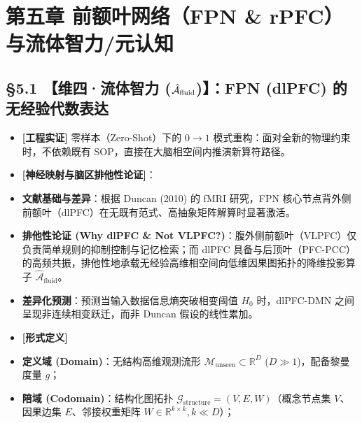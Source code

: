 \documentclass[11pt,a4paper,oneside]{ctexart}
\begin{document}
\section{第五章 前额叶网络（FPN \& rPFC）与流体智力/元认知}

\subsection{§5.1 【维四·流体智力 ($\protect\hat{\mathcal{A}}_{\text{fluid}}$)】：FPN (dlPFC) 的无经验代数表达}

\begin{itemize}\item \textbf{[工程实证]} 零样本（Zero-Shot）下的 $0 \to 1$ 模式重构：面对全新的物理约束时，不依赖既有 SOP，直接在大脑相空间内推演新算符路径。\end{itemize}
\begin{itemize}\item \textbf{[神经映射与脑区排他性论证]}：\end{itemize}
\begin{itemize}\item \textbf{文献基础与差异}：根据 Duncan (2010) 的 fMRI 研究，FPN 核心节点背外侧前额叶（dlPFC）在无既有范式、高抽象矩阵解算时显著激活。\end{itemize}
\begin{itemize}\item \textbf{排他性论证 (Why dlPFC \& Not VLPFC?)}：腹外侧前额叶（VLPFC）仅负责简单规则的抑制控制与记忆检索；而 dlPFC 具备与后顶叶（PFC-PCC）的高频共振，排他性地承载\textit{}无经验高维相空间向低维因果图拓扑的降维投影算子 $\hat{\mathcal{A}}_{\text{fluid}}$\textit{}。\end{itemize}
\begin{itemize}\item \textbf{差异化预测}：预测当输入数据信息熵突破相变阈值 $H_0$ 时，dlPFC-DMN 之间呈现非连续相变跃迁，而非 Duncan 假设的线性累加。\end{itemize}
\begin{itemize}\item \textbf{[形式定义]}\end{itemize}
\begin{itemize}\item \textbf{定义域 (Domain)}：无结构高维观测流形 $\mathcal{M}_{\text{unseen}} \subset \mathbb{R}^D$ ($D \gg 1$)，配备黎曼度量 $g$；\end{itemize}
\begin{itemize}\item \textbf{陪域 (Codomain)}：结构化图拓扑 $\mathcal{G}_{\text{structure}} = (V, E, W)$（概念节点集 $V$、因果边集 $E$、邻接权重矩阵 $W \in \mathbb{R}^{k \times k}, k \ll D$）；\end{itemize}
\end{document}
